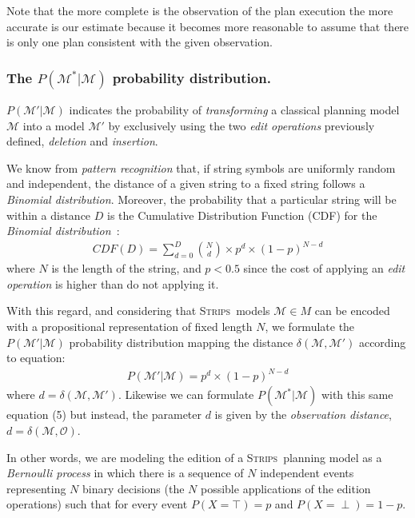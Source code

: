 \documentclass[letterpaper]{article} %
\newcommand{\strips}{\textsc{Strips}}     %
\begin{document}
Note that the more complete is the observation of the plan execution the more accurate is our estimate because it becomes more reasonable to assume that there is only one plan consistent with the given observation.

\subsubsection{The $P(\mathcal{M^*}|\mathcal{M})$ probability distribution.} $P(\mathcal{M'}|\mathcal{M})$ indicates the probability of {\em transforming} a classical planning model $\mathcal{M}$ into a model $\mathcal{M'}$ by exclusively using the two {\em edit operations} previously defined, {\em deletion} and {\em insertion}.

We know from {\em pattern recognition} that, if string symbols are uniformly random and independent, the distance of a given string to a fixed string follows a {\em Binomial distribution}. Moreover, the probability that a particular string will be within a distance $D$ is the Cumulative Distribution Function (CDF) for the {\em Binomial distribution}~\cite{wilcox1981review}:
\begin{align}
CDF(D)=\sum_{d=0}^D{{N}\choose{d}}  \times p^d \times (1-p)^{N-d}
\end{align}
where $N$ is the length of the string, and $p<0.5$ since the cost of applying an {\em edit operation} is higher than do not applying it.

With this regard, and considering that \strips\ models $\mathcal{M}\in M$ can be encoded with a propositional representation of fixed length $N$, we formulate the $P(\mathcal{M'}|\mathcal{M})$ probability distribution mapping the distance $\delta(\mathcal{M},\mathcal{M'})$ according to equation:
\begin{align}
P(\mathcal{M'}|\mathcal{M}) = p^d \times (1-p)^{N-d}
\end{align}
where $d=\delta(\mathcal{M},\mathcal{M}')$. Likewise we can formulate $P(\mathcal{M^*}|\mathcal{M})$ with this same equation (5) but instead, the parameter $d$ is given by the {\em observation distance}, $d=\delta(\mathcal{M},\mathcal{O})$.

In other words, we are modeling the edition of a \strips\ planning model as a {\em Bernoulli process} in which there is a sequence of $N$ independent events representing $N$ binary decisions (the $N$ possible applications of the edition operations) such that for every event $P(X=\top)=p$ and $P(X=\perp)=1-p$.
\end{document}

